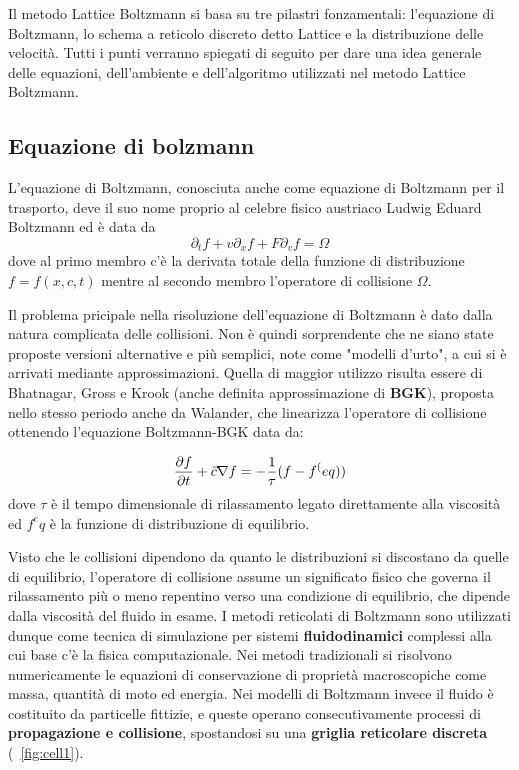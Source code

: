 Il metodo Lattice Boltzmann si basa su tre pilastri fonzamentali: l'equazione di Boltzmann, lo schema a reticolo discreto detto Lattice e la distribuzione delle velocit\`a. Tutti i punti verranno spiegati di seguito per dare una idea generale delle equazioni, dell'ambiente e dell'algoritmo utilizzati nel metodo Lattice Boltzmann.

\subsection{Equazione di bolzmann}
L'equazione di Boltzmann, conosciuta anche come equazione di Boltzmann per il trasporto, deve il suo nome proprio al celebre fisico austriaco Ludwig Eduard Boltzmann ed \`e data da
$${\displaystyle \partial _{t}f+v\partial _{x}f+F\partial _{v}f=\Omega}$$
dove al primo membro c'\`e la derivata totale della funzione di distribuzione $f = f(x, c, t)$ mentre al secondo membro l'operatore di collisione $\Omega$.

Il problema pricipale nella risoluzione dell'equazione di Boltzmann \`e dato dalla natura complicata delle collisioni. Non \`e quindi sorprendente che ne siano state proposte versioni alternative e pi\`u semplici, note come "modelli d'urto", a cui si \`e arrivati mediante approssimazioni. Quella di maggior utilizzo risulta essere di Bhatnagar, Gross e Krook (anche definita approssimazione di \textbf{BGK}), proposta nello stesso periodo anche da Walander, che linearizza l'operatore di collisione ottenendo l'equazione Boltzmann-BGK data da: 

$${\partial{f}\over{\partial t}}+\vec{c} \nabla f= -{1\over{\tau}}(f-f^(eq))$$
dove $\tau$ \`e il tempo dimensionale di rilassamento legato direttamente alla viscosit\`a ed $f^eq$ \`e la funzione di distribuzione di equilibrio.

Visto che le collisioni dipendono da quanto le distribuzioni si discostano da quelle di equilibrio, l'operatore di collisione assume un significato fisico che governa il rilassamento pi\`u o meno repentino verso una condizione di equilibrio, che dipende dalla viscosit\`a del fluido in esame. 
I metodi reticolati di Boltzmann sono utilizzati dunque come tecnica di simulazione per sistemi \textbf{fluidodinamici} complessi alla cui base c'\`e la fisica computazionale. Nei metodi tradizionali si risolvono numericamente le equazioni di conservazione di propriet\`a macroscopiche come massa, quantit\`a di moto ed energia. Nei modelli di Boltzmann invece il fluido \`e costituito da particelle fittizie, e queste operano consecutivamente processi di \textbf{propagazione e collisione}, spostandosi su una \textbf{griglia reticolare discreta} (\figurename~\ref{fig:cell1}).

